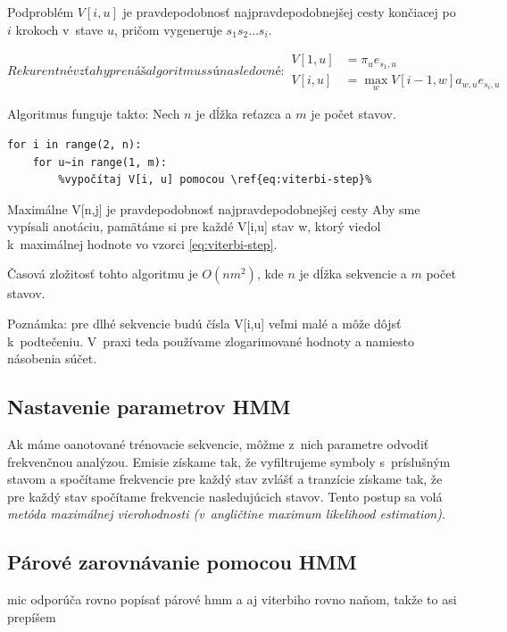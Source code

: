 Podproblém $V[i,u]$ je pravdepodobnosť najpravdepodobnejšej cesty končiacej po $i$ krokoch v~stave $u$, pričom vygeneruje $s_1 s_2 \dots s_i$.

\begin{subequations}
Rekurentné vzťahy pre náš algoritmus sú nasledovné:
\begin{align}
        \label{eq:viterbi-init}
        V[1,u] &= \pi_u e_{s_1, u}\\
        \label{eq:viterbi-step}
        V[i,u] &= \max_w V[i-1, w] a_{w,u} e_{s_i, u}
\end{align}
\end{subequations}

Algoritmus funguje takto:
Nech $n$ je dĺžka reťazca a $m$ je počet stavov.

\begin{lstlisting}[escapechar=\%]
%Nainicializuj $V[1,i]\, \forall i$ podľa \ref{eq:viterbi-init}%
for i in range(2, n):
    for u~in range(1, m):
        %vypočítaj V[i, u] pomocou \ref{eq:viterbi-step}%
\end{lstlisting}
Maximálne V[n,j] je pravdepodobnosť najpravdepodobnejšej cesty
Aby sme vypísali anotáciu, pamätáme si pre každé V[i,u] stav w, ktorý viedol k~maximálnej hodnote vo vzorci \ref{eq:viterbi-step}.

Časová zložitosť tohto algoritmu je $O(nm^2)$, kde $n$ je dĺžka sekvencie a $m$ počet stavov.

Poznámka: pre dlhé sekvencie budú čísla V[i,u] veľmi malé a môže dôjsť k~podtečeniu. V~praxi teda používame zlogarimované hodnoty a namiesto násobenia súčet.

\subsection{Nastavenie parametrov HMM}
\label{subsec:hmmtraining}
Ak máme oanotované trénovacie sekvencie, môžme z~nich parametre odvodiť frekvenčnou analýzou. Emisie získame tak, že vyfiltrujeme symboly s~príslušným stavom a spočítame frekvencie pre každý stav zvlášť a tranzície získame tak, že pre každý stav spočítame frekvencie nasledujúcich stavov. Tento postup sa volá \textit{metóda maximálnej vierohodnosti (v~angličtine maximum likelihood estimation)}. \cite{ durbin, wiki:mle}

\subsection{Párové zarovnávanie pomocou HMM}
\label{subsec:hmm-alignment}
\todo mic odporúča rovno popísať párové hmm a aj viterbiho rovno naňom, takže to asi prepíšem

